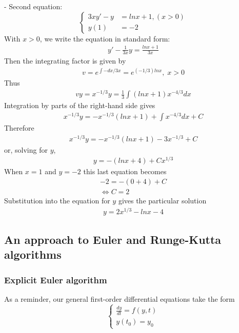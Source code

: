 \documentclass[a4paper]{article}
\begin{document}
- Second equation:
\begin{equation*}
  \begin{cases}
    3xy' - y & = lnx + 1, (x > 0) \\
    y(1)     & = -2
  \end{cases}
\end{equation*}
With \(x > 0\), we write the equation in standard form:
\begin{gather*}
  y' - \frac{1}{3x}y = \frac{lnx + 1}{3x}
\end{gather*}
Then the integrating factor is given by
\begin{gather*}
  v = e^{\int -dx/3x} = e^{(-1/3)lnx},\;x > 0
\end{gather*}
Thus
\begin{gather*}
  vy = x^{-1/3} y = \frac{1}{3} \int(lnx + 1) x^{-4/3} dx
\end{gather*}
Integration by parts of the right-hand side gives
\begin{gather*}
  x^{-1/3}y = -x^{-1/3}(lnx+1) + \int x^{-4/3}dx + C
\end{gather*}
Therefore
\begin{gather*}
  x^{-1/3}y = -x^{-1/3}(lnx+1) - 3x^{-1/3} + C
\end{gather*}
or, solving for \(y\),
\begin{gather*}
  y = -(lnx + 4) + Cx^{1/3}
\end{gather*}
When \(x = 1\) and \(y = -2\) this last equation becomes
\begin{gather*}
  -2 = -(0+4) + C \\
  \Leftrightarrow C = 2
\end{gather*}
Substitution into the equation for \(y\) gives the particular solution
\begin{gather*}
  y = 2x^{1/3} - lnx - 4
\end{gather*}


\subsection{An approach to Euler and Runge-Kutta algorithms}
\subsubsection{Explicit Euler algorithm}
As a reminder, our general first-order differential equations take the form
\begin{equation*}
  \begin{cases}
    \frac{dy}{dt} = f(y,t) \\
    y(t_0) = y_0
  \end{cases}
\end{equation*}
\end{document}
